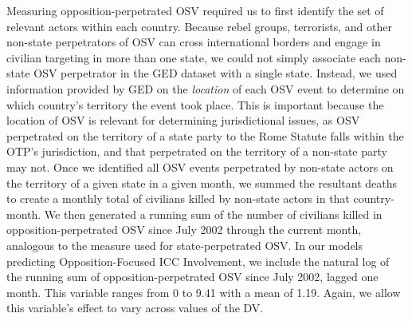 Measuring opposition-perpetrated OSV required us to first identify the set of relevant actors within each country. Because rebel groups, terrorists, and other non-state perpetrators of OSV can cross international borders and engage in civilian targeting in more than one state, we could not simply associate each non-state OSV perpetrator in the GED dataset with a single state. Instead, we used information provided by GED on the \textit{location} of each OSV event to determine on which country's territory the event took place. This is important because the location of OSV is relevant for determining jurisdictional issues, as OSV perpetrated on the territory of a state party to the Rome Statute falls within the OTP's jurisdiction, and that perpetrated on the territory of a non-state party may not. Once we identified all OSV events perpetrated by non-state actors on the territory of a given state in a given month, we summed the resultant deaths to create a monthly total of civilians killed by non-state actors in that country-month. We then generated a running sum of the number of civilians killed in opposition-perpetrated OSV since July 2002 through the current month, analogous to the measure used for state-perpetrated OSV. In our models predicting Opposition-Focused ICC Involvement, we include the natural log of the running sum of opposition-perpetrated OSV since July 2002, lagged one month. This variable ranges from 0 to 9.41 with a mean of 1.19. Again, we allow this variable's effect to vary across values of the DV.

